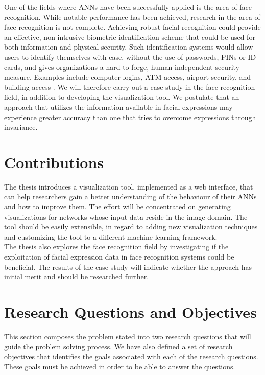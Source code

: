 \noindent One of the fields where ANNs have been successfully applied is the area of face recognition. While notable performance has been achieved, research in the area of face recognition is not complete. Achieving robust facial recognition could provide an effective, non-intrusive biometric identification scheme that could be used for both information and physical security. Such identification systems would allow users to identify themselves with ease, without the use of passwords, PINs or ID cards, and gives organizations a hard-to-forge, human-independent security measure. Examples include computer logins, ATM access, airport security, and building access \cite{application_1, application_2, application_3}. We will therefore carry out a case study in the face recognition field, in addition to developing the visualization tool. We postulate that an approach that utilizes the information available in facial expressions may experience greater accuracy than one that tries to overcome expressions through invariance. \\


\section{Contributions}

The thesis introduces a visualization tool, implemented as a web interface, that can help researchers gain a better understanding of the behaviour of their ANNs and how to improve them. The effort will be concentrated on generating visualizations for networks whose input data reside in the image domain. The tool should be easily extensible, in regard to adding new visualization techniques and customizing the tool to a different machine learning framework. \\

\noindent The thesis also explores the face recognition field by investigating if the exploitation of facial expression data in face recognition systems could be beneficial. The results of the case study will indicate whether the approach has initial merit and should be researched further.

\section{Research Questions and Objectives}

This section composes the problem stated into two research questions that will guide the problem solving process. We have also defined a set of research objectives that identifies the goals associated with each of the research questions. These goals must be achieved in order to be able to answer the questions.

